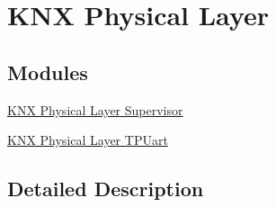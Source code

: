 \hypertarget{group___k_n_x___p_h}{}\section{K\+NX Physical Layer}
\label{group___k_n_x___p_h}
\subsection*{Modules}
\begin{DoxyCompactItemize}
\item 
\hyperlink{group___k_n_x___p_h___sup}{K\+N\+X Physical Layer Supervisor}
\item 
\hyperlink{group___k_n_x___p_h___t_p_uart}{K\+N\+X Physical Layer T\+P\+Uart}
\end{DoxyCompactItemize}


\subsection{Detailed Description}
